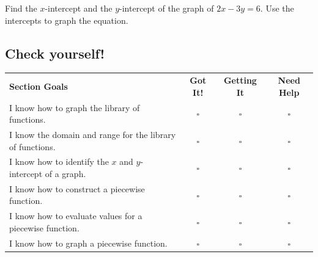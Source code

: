 \documentclass[oneside,10pt]{book}
\begin{document}
\newpage



\example
Find the $x$-intercept and the $y$-intercept of the graph of
$2x-3y=6$.
Use the intercepts to graph the equation.

\vfill






\subsection*{Check yourself!}

\noindent
\begin{tabular}{@{}p{4.5in} c c c@{}}
\textbf{Section Goals} & \textbf{Got It!} & \textbf{Getting It} & \textbf{Need Help}\\
I know how to graph the library of functions. & $\square$ & $\square$ & $\square $ \\
I know the domain and range for the library of functions. & $\square$ & $\square$ & $\square $ \\
I know how to identify the $x$ and $y$-intercept of a graph. & $\square$ & $\square$ & $\square $ \\
I know how to construct a piecewise function. & $\square$ & $\square$ & $\square $ \\
I know how to evaluate values for a piecewise function. & $\square$ & $\square$ & $\square $ \\
I know how to graph a piecewise function. & $\square$ & $\square$ & $\square $ \\


\end{tabular}
\end{document}
